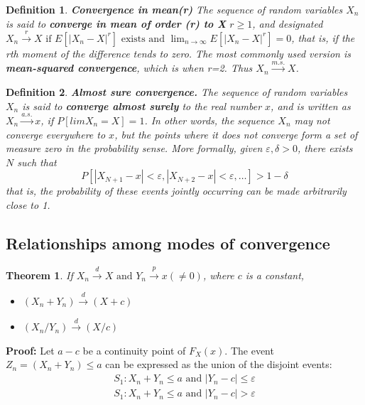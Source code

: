 \documentclass{article}
\newtheorem{definition}{Definition}[section]
\newtheorem{theorem}{Theorem}[section]
\begin{document}
\begin{definition}
    \textbf{Convergence in mean(r)} The sequence of random variables \(X_n\) is said to \textbf{converge in mean of order (r) to X} \(r \geq 1\), and designated \(X_n \stackrel{r}{\longrightarrow} X \text{ if } E[|X_n-X|^r] \text{ exists and } \lim_{n \rightarrow \infty} E[|X_n-X|^r]=0\), that is, if the rth moment of the difference tends to zero. The most commonly used version is \textbf{mean-squared convergence}, which is when r=2. Thus \(X_n \stackrel{m.s.}{\longrightarrow} X\).
\end{definition}

\begin{definition}
    \textbf{Almost sure convergence.} The sequence of random variables \(X_n\) is said to \textbf{converge almost surely} to the real number $x$, and is written as \(X_n \stackrel{a.s.}{\longrightarrow} x\), if \(P[lim X_n=X]=1\). In other words, the sequence \(X_n\) may not converge everywhere to \(x\), but the points where it does not converge form a set of measure zero in the probability sense. More formally, given \(\varepsilon,\delta>0\), there exists \(N\) such that
    \begin{equation*}
        P[|X_{N+1}-x|<\varepsilon,|X_{N+2}-x|<\varepsilon,\dots] > 1-\delta
    \end{equation*}
    that is, the probability of these events jointly occurring can be made arbitrarily close to 1.
\end{definition}

\subsection{Relationships among modes of convergence}

\begin{theorem}
    If \(X_n \stackrel{d} \longrightarrow X \text{ and } Y_n \stackrel{p} \longrightarrow x (\neq 0) \), where $c$ is a constant, 
    \begin{itemize}
        \item[(a)] \((X_n+Y_n) \stackrel{d} \longrightarrow (X+c) \)
        \item[(b)] \((X_n/Y_n) \stackrel{d} \longrightarrow (X/c)\) 
    \end{itemize}
\end{theorem}

\textbf{Proof:} Let \(a-c\) be a continuity point of \(F_X(x)\). The event \(Z_n=(X_n+Y_n) \leq a\) can be expressed as the union of the disjoint events:
\begin{equation*}
    \begin{split}
        S_1: X_n+Y_n \leq a \text{ and } |Y_n-c| \leq \varepsilon\\
        S_1: X_n+Y_n \leq a \text{ and } |Y_n-c| > \varepsilon
    \end{split}
\end{equation*}
\end{document}
